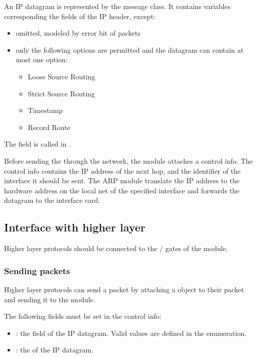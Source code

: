 An IP datagram is represented by the  message class.
It contains variables corresponding the fields of the IP header, except:
\begin{itemize}
  \item {} omitted, modeled by error bit of packets
  \item {} only the following options are permitted and the
                       datagram can contain at most one option:
        \begin{itemize}
          \item Loose Source Routing
          \item Strict Source Routing
          \item Timestamp
          \item Record Route
        \end{itemize}
\end{itemize}

The  field is called  in
.

Before sending the  through the network, the 
module attaches a  control info.
The control info contains the IP address of the next hop, and the
identifier of the interface it should be sent. The ARP module translate
the IP address to the hardware address on the local net of the specified
interface and forwards the datagram to the interface card.

\subsection{Interface with higher layer}

Higher layer protocols should be connected to the /
gates of the  module.

\subsubsection*{Sending packets}

Higher layer protocols can send a packet by attaching a 
object to their packet and sending it to the  module.


The following fields must be set in the control info:
\begin{itemize}
  \item {}: the  field of the IP datagram. Valid values
        are defined in the  enumeration.
  \item {}: the  of the IP datagram.
\end{itemize}

